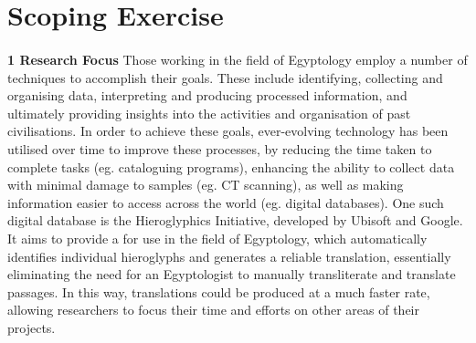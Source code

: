 \documentclass{article}
\author{Bree Kelly} \date{}
\begin{document}
\maketitle

\section*{Scoping Exercise}

\paragraph{} \noindent \large \break
\textbf{1 Research Focus}
\newline \break
Those working in the field of Egyptology employ a number of techniques to accomplish their goals. These include identifying, collecting and organising data, interpreting and producing processed information, and ultimately providing insights into the activities and organisation of past civilisations. In order to achieve these goals, ever-evolving technology has been utilised over time to improve these processes, by reducing the time taken to complete tasks (eg. cataloguing programs), enhancing the ability to collect data with minimal damage to samples (eg. CT scanning), as well as making information easier to access across the world (eg. digital databases). One such digital database is the Hieroglyphics Initiative, developed by Ubisoft and Google. It aims to provide a  for use in the field of Egyptology, which automatically identifies individual hieroglyphs and generates a reliable translation, essentially eliminating the need for an Egyptologist to manually transliterate and translate passages. In this way, translations could be produced at a much faster rate, allowing researchers to focus their time and efforts on other areas of their projects. 
\end{document}
